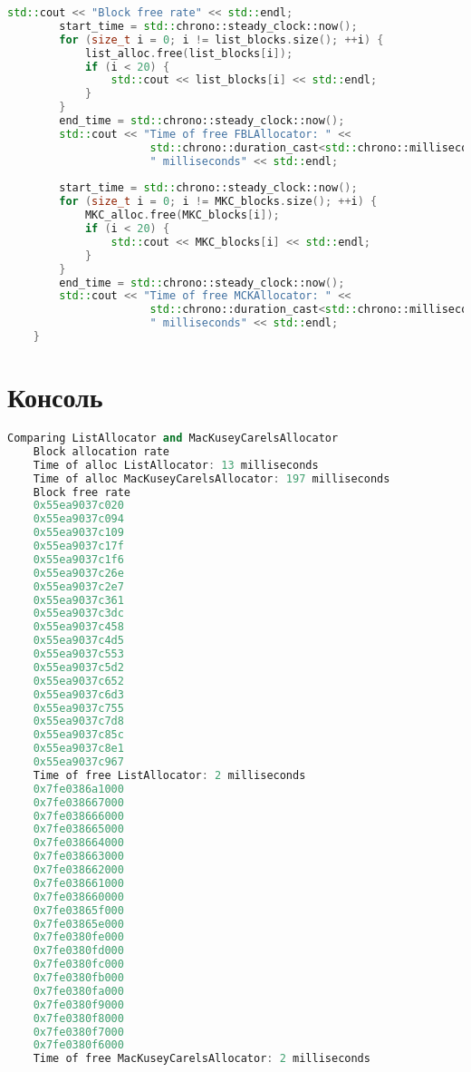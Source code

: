 \documentclass[a4paper, 12pt]{article}
\begin{document}
\begin{lstlisting}[language=C++]
        std::cout << "Block free rate" << std::endl;
        start_time = std::chrono::steady_clock::now();
        for (size_t i = 0; i != list_blocks.size(); ++i) {
            list_alloc.free(list_blocks[i]);
            if (i < 20) {
                std::cout << list_blocks[i] << std::endl;
            }
        }
        end_time = std::chrono::steady_clock::now();
        std::cout << "Time of free FBLAllocator: " << 
                      std::chrono::duration_cast<std::chrono::milliseconds>(end_time - start_time).count() << 
                      " milliseconds" << std::endl;
    
        start_time = std::chrono::steady_clock::now();
        for (size_t i = 0; i != MKC_blocks.size(); ++i) {
            MKC_alloc.free(MKC_blocks[i]);
            if (i < 20) {
                std::cout << MKC_blocks[i] << std::endl;
            }
        }
        end_time = std::chrono::steady_clock::now();
        std::cout << "Time of free MCKAllocator: " << 
                      std::chrono::duration_cast<std::chrono::milliseconds>(end_time - start_time).count() << 
                      " milliseconds" << std::endl;
    }
\end{lstlisting}

\newpage
\section{Консоль}
\begin{lstlisting}[language=C++]
    Comparing ListAllocator and MacKuseyCarelsAllocator
    Block allocation rate
    Time of alloc ListAllocator: 13 milliseconds
    Time of alloc MacKuseyCarelsAllocator: 197 milliseconds
    Block free rate
    0x55ea9037c020
    0x55ea9037c094
    0x55ea9037c109
    0x55ea9037c17f
    0x55ea9037c1f6
    0x55ea9037c26e
    0x55ea9037c2e7
    0x55ea9037c361
    0x55ea9037c3dc
    0x55ea9037c458
    0x55ea9037c4d5
    0x55ea9037c553
    0x55ea9037c5d2
    0x55ea9037c652
    0x55ea9037c6d3
    0x55ea9037c755
    0x55ea9037c7d8
    0x55ea9037c85c
    0x55ea9037c8e1
    0x55ea9037c967
    Time of free ListAllocator: 2 milliseconds
    0x7fe0386a1000
    0x7fe038667000
    0x7fe038666000
    0x7fe038665000
    0x7fe038664000
    0x7fe038663000
    0x7fe038662000
    0x7fe038661000
    0x7fe038660000
    0x7fe03865f000
    0x7fe03865e000
    0x7fe0380fe000
    0x7fe0380fd000
    0x7fe0380fc000
    0x7fe0380fb000
    0x7fe0380fa000
    0x7fe0380f9000
    0x7fe0380f8000
    0x7fe0380f7000
    0x7fe0380f6000
    Time of free MacKuseyCarelsAllocator: 2 milliseconds
\end{lstlisting}
\end{document}
